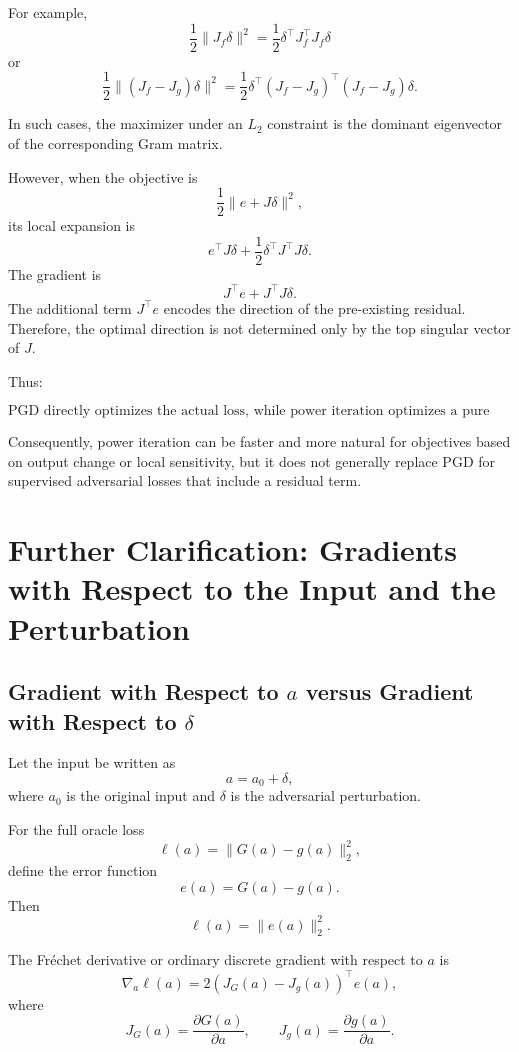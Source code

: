 \documentclass{article}
\begin{document}
For example,
\[
    \frac{1}{2}\|J_f\delta\|^2
    =
    \frac{1}{2}\delta^\top J_f^\top J_f\delta
\]
or
\[
    \frac{1}{2}\|(J_f-J_g)\delta\|^2
    =
    \frac{1}{2}\delta^\top (J_f-J_g)^\top(J_f-J_g)\delta.
\]

In such cases, the maximizer under an \(L_2\) constraint is the dominant eigenvector of the corresponding Gram matrix.

However, when the objective is
\[
    \frac{1}{2}\|e+J\delta\|^2,
\]
its local expansion is
\[
    e^\top J\delta
    +
    \frac{1}{2}\delta^\top J^\top J\delta.
\]
The gradient is
\[
    J^\top e + J^\top J\delta.
\]
The additional term \(J^\top e\) encodes the direction of the pre-existing residual. Therefore, the optimal direction is not determined only by the top singular vector of \(J\).

Thus:

\[
\boxed{
\text{PGD directly optimizes the actual loss, while power iteration optimizes a pure local amplification surrogate.}
}
\]

Consequently, power iteration can be faster and more natural for objectives based on output change or local sensitivity, but it does not generally replace PGD for supervised adversarial losses that include a residual term.

\section{Further Clarification: Gradients with Respect to the Input and the Perturbation}

\subsection{Gradient with Respect to \(a\) versus Gradient with Respect to \(\delta\)}

Let the input be written as
\[
    a = a_0+\delta,
\]
where \(a_0\) is the original input and \(\delta\) is the adversarial perturbation.

For the full oracle loss
\[
    \ell(a)
    =
    \|G(a)-g(a)\|_2^2,
\]
define the error function
\[
    e(a)=G(a)-g(a).
\]
Then
\[
    \ell(a)=\|e(a)\|_2^2.
\]

The Fréchet derivative or ordinary discrete gradient with respect to \(a\) is
\[
    \nabla_a \ell(a)
    =
    2\left(J_G(a)-J_g(a)\right)^\top e(a),
\]
where
\[
    J_G(a)=\frac{\partial G(a)}{\partial a},
    \qquad
    J_g(a)=\frac{\partial g(a)}{\partial a}.
\]
\end{document}
